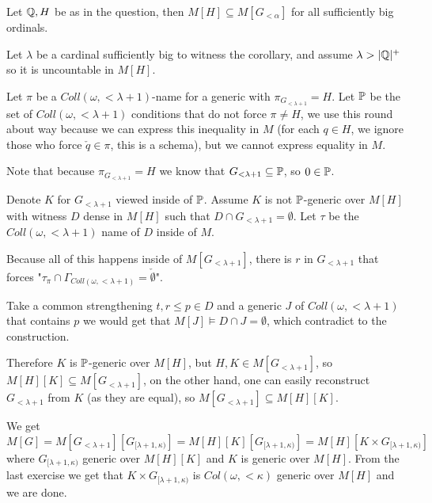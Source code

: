 \begin{cExercise}
\begin{cPart}
		\begin{corollary}
			Let $\Q,H$ be as in the question, then $M[H]\subseteq M[G_{<\alpha}]$ for all sufficiently big ordinals.
		\end{corollary}
		
		Let $\lambda$ be a cardinal sufficiently big to witness the corollary, and assume $\lambda>|\Q|^+$ so it is uncountable in $M[H]$.
		
		Let $\pi$ be a $Coll(\omega,<\lambda+1)$-name for a generic with $\pi_{G_{<\lambda+1}}=H$. Let $\P$ be the set of $Coll(\omega,<\lambda+1)$ conditions that do not force $\pi\ne H$, we use this round about way because we can express this inequality in $M$ (for each $q\in H$, we ignore those who force $\check q\in \pi$, this is a schema), but we cannot express equality in $M$.
		
		Note that because $\pi_{G_{<\lambda+1}}=H$ we know that $G_{<\lambda+1}\subseteq \P$, so $0\in \P$.
		
		Denote $K$ for $G_{<\lambda+1}$ viewed inside of $\P$. Assume $K$ is not $\P$-generic over $M[H]$ with witness $D$ dense in $M[H]$ such that $D\cap G_{<\lambda+1}=\emptyset$. Let $\tau$ be the $Coll(\omega,<\lambda+1)$ name of $D$ inside of $M$.
		
		Because all of this happens inside of $M[G_{<\lambda+1}]$, there is $r$ in $G_{<\lambda+1}$ that forces "$\tau_\pi\cap \Gamma_{Coll(\omega,<\lambda+1)}=\check\emptyset$".
		
		Take a common strengthening $t,r\le p\in D$ and a generic $J$ of $Coll(\omega,<\lambda+1)$ that contains $p$ we would get that $M[J]\models D\cap J=\emptyset$, which contradict to the construction.
		
		Therefore $K$ is $\P$-generic over $M[H]$, but $H,K\in M[G_{<\lambda+1}]$, so $M[H][K]\subseteq M[G_{<\lambda+1}]$, on the other hand, one can easily reconstruct $G_{<\lambda+1}$ from $K$ (as they are equal), so $M[G_{<\lambda+1}]\subseteq M[H][K]$.
		
		We get $M[G]=M[G_{<\lambda+1}][G_{[\lambda+1,\kappa)}]=M[H][K][G_{[\lambda+1,\kappa)}]=M[H][K\times G_{[\lambda+1,\kappa)}]$ where $G_{[\lambda+1,\kappa)}$ generic over $M[H][K]$ and $K$ is generic over $M[H]$. From the last exercise we get that $K\times G_{[\lambda+1,\kappa)}$ is $Col(\omega,<\kappa)$ generic over $M[H]$ and we are done.
	\end{cPart}
\end{cExercise}





